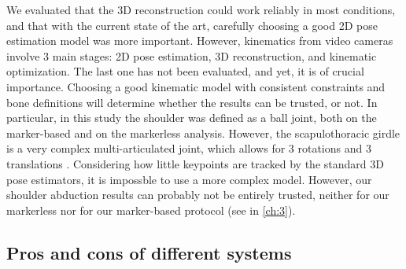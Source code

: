 We evaluated that the 3D reconstruction could work reliably in most conditions, and that with the current state of the art, carefully choosing a good 2D pose estimation model was more important. However, kinematics from video cameras involve 3 main stages: 2D pose estimation, 3D reconstruction, and kinematic optimization. The last one has not been evaluated, and yet, it is of crucial importance. Choosing a good kinematic model with consistent constraints and bone definitions will determine whether the results can be trusted, or not. In particular, in this study the shoulder was defined as a ball joint, both on the marker-based and on the markerless analysis. However, the scapulothoracic girdle is a very complex multi-articulated joint, which allows for 3 rotations and 3 translations \cite{Seth2016}. Considering how little keypoints are tracked by the standard 3D pose estimators, it is impossble to use a more complex model. However, our shoulder abduction results can probably not be entirely trusted, neither for our markerless nor for our marker-based protocol (see  in \autoref{ch:3}).










\subsection{Pros and cons of different systems}

